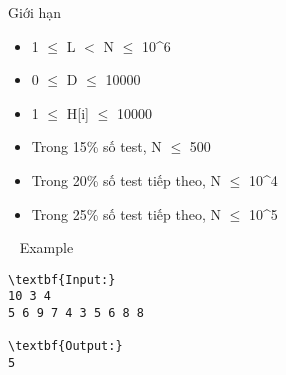 Giới hạn
\begin{itemize}
	\item 1  $\le$  L $<$ N  $\le$  10^6
	\item 0  $\le$  D  $\le$  10000
	\item 1  $\le$  H[i]  $\le$  10000
	\item Trong 15\% số test, N  $\le$  500
	\item Trong 20\% số test tiếp theo, N  $\le$  10^4
	\item Trong 25\% số test tiếp theo, N  $\le$  10^5
\end{itemize}

 
Example
\begin{verbatim}
\textbf{Input:}
10 3 4
5 6 9 7 4 3 5 6 8 8

\textbf{Output:}
5\end{verbatim}